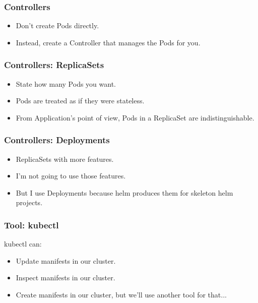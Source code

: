     \begin{frame}
        \frametitle{Controllers}
        \begin{itemize}
            \item Don't create Pods directly.
            \item Instead, create a Controller that manages the Pods for you.
        \end{itemize}
    \end{frame}

    \begin{frame}
        \frametitle{Controllers: ReplicaSets}
        \begin{itemize}
            \item State how many Pods you want.\pause
            \item Pods are treated as if they were stateless.\pause
            \item From Application's point of view, Pods in a ReplicaSet are indistinguishable.
        \end{itemize}
    \end{frame}

    \begin{frame}
        \frametitle{Controllers: Deployments}
        \begin{itemize}
            \item ReplicaSets with more features.\pause
            \item I'm not going to use those features.\pause
            \item But I use Deployments because helm produces them for skeleton helm projects.
        \end{itemize}
    \end{frame}

    \begin{frame}
        \frametitle{Tool: kubectl\footnotemark}
        kubectl can:
        \begin{itemize}
            \item Update manifests in our cluster.\pause
            \item Inspect manifests in our cluster.\pause
            \item Create manifests in our cluster, but we'll use another tool for that...
        \end{itemize}
    \end{frame}

